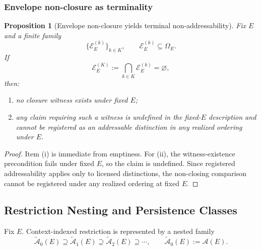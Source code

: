 \documentclass[aps,prx,onecolumn,11pt]{revtex4-2}
\theoremstyle{plain}
\newtheorem{proposition}{Proposition}
\theoremstyle{definition}
\theoremstyle{remark}
\begin{document}
\subsubsection{Envelope non-closure as terminality}
\label{subsec:envelope_nonclosure_terminality}

\begin{proposition}[Envelope non-closure yields terminal non-addressability]
\label{prop:nonclosure_implies_terminal_nonaddr}
Fix \(E\) and a finite family
\[
\{\mathcal{E}^{(k)}_E\}_{k\in K},
\qquad
\mathcal{E}^{(k)}_E\subseteq\Omega_E.
\]
If
\[
\mathcal{E}^{(K)}_E
:=
\bigcap_{k\in K}
\mathcal{E}^{(k)}_E
=
\varnothing,
\]
then:
\begin{enumerate}[label=(\roman*), leftmargin=2.2em]
\item no closure witness exists under fixed \(E\);
\item any claim requiring such a witness is \emph{undefined} in the
fixed-\(E\) description and cannot be registered as an addressable
distinction in any realized ordering under \(E\).
\end{enumerate}
\end{proposition}

\begin{proof}
Item (i) is immediate from emptiness. For (ii), the witness-existence
precondition fails under fixed \(E\), so the claim is undefined. Since
registered addressability applies only to licensed distinctions, the
non-closing comparison cannot be registered under any realized ordering
at fixed \(E\).
\end{proof}

\subsection{Restriction Nesting and Persistence Classes}
\label{subsec:restriction_nesting_persistence_struct}

Fix \(E\). Context-indexed restriction is represented by a nested family
\[
\widetilde{\mathcal{A}}_0(E)
\supseteq
\widetilde{\mathcal{A}}_1(E)
\supseteq
\widetilde{\mathcal{A}}_2(E)
\supseteq
\cdots,
\qquad
\widetilde{\mathcal{A}}_0(E):=\mathcal{A}(E).
\]
\end{document}
